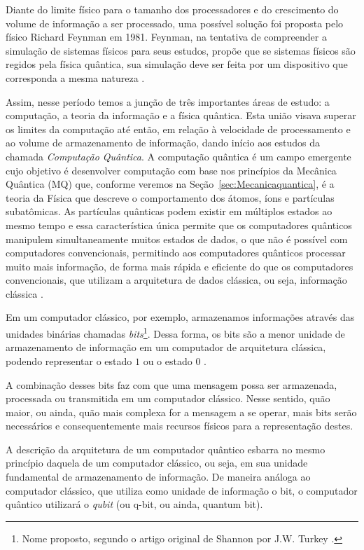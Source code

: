 Diante do limite físico para o tamanho dos processadores e do crescimento do volume de informação a ser processado, uma possível solução foi proposta pelo físico Richard Feynman em 1981. Feynman, na tentativa de compreender a simulação de sistemas físicos para seus estudos, propõe que se sistemas físicos são regidos pela física quântica, sua simulação deve ser feita por um dispositivo que corresponda a mesma natureza \cite{caldeira}.

Assim, nesse período temos a junção de três importantes áreas de estudo: a computação, a teoria da informação e a física quântica. Esta união visava superar os limites da computação até então, em relação à velocidade de processamento e ao volume de armazenamento de informação, dando início aos estudos da chamada \textit{Computação Quântica}. A computação quântica é um campo emergente cujo objetivo é desenvolver computação com base nos princípios da Mecânica Quântica (MQ) que, conforme veremos na Seção~\ref{sec:Mecanicaquantica}, é a teoria da Física que descreve o comportamento dos átomos, íons e partículas subatômicas. As partículas quânticas podem existir em múltiplos estados ao mesmo tempo e essa característica única permite que os computadores quânticos manipulem simultaneamente muitos estados de dados, o que não é possível com computadores convencionais, permitindo aos computadores quânticos processar muito mais informação, de forma mais rápida e eficiente do que os computadores convencionais, que utilizam a arquitetura de dados clássica, ou seja, informação clássica \cite{CompInfoQuantica}.

Em um computador clássico, por exemplo, armazenamos informações através das unidades binárias chamadas \textit{bits}\footnote{Nome proposto, segundo o artigo original de Shannon por J.W. Turkey \cite{MTC}.}. Dessa forma, os bits são a menor unidade de armazenamento de informação em um computador de arquitetura clássica, podendo representar o estado \(1\) ou o estado \(0\) \cite{MTC}.

A combinação desses bits faz com que uma mensagem possa ser armazenada, processada ou transmitida em um computador clássico. Nesse sentido, quão maior, ou ainda, quão mais complexa for a mensagem a se operar, mais bits serão necessários e consequentemente mais recursos físicos para a representação destes.

A descrição da arquitetura de um computador quântico esbarra no mesmo princípio daquela de um computador clássico, ou seja, em sua unidade fundamental de armazenamento de informação. De maneira análoga ao computador clássico, que utiliza como unidade de informação o bit, o computador quântico utilizará o \textit{qubit} (ou q-bit, ou ainda, quantum bit).

